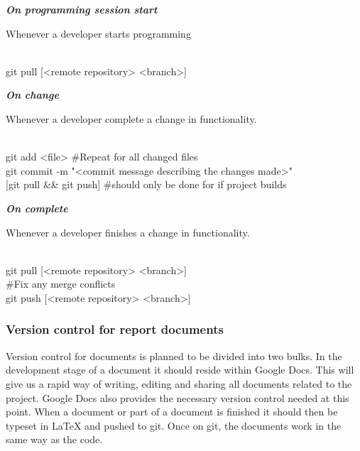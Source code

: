 \textit{\textbf{On programming session start}}
\begin{description}
	{\indentitem \item[Description:] Whenever a developer starts programming}
	{\indentitem \item[Command:] \hfill \\
		\hspace*{3em} git pull [<remote repository> <branch>]}
\end{description}

\textit{\textbf{On change}}
\begin{description}
	{\indentitem \item[Description:] Whenever a developer complete a change in functionality.}
	{\indentitem \item[Command:] \hfill \\
	\hspace*{3em} git add <file> \#Repeat for all changed files \\
	\hspace*{3em} git commit -m "<commit message describing the changes made>"\\
	\hspace*{3em} [git pull \&\& git push] \#should only be done for if project builds}
\end{description}

\textit{\textbf{On complete}}
\begin{description}
{\indentitem \item[Description:]  Whenever a developer finishes a change in functionality.}
{\indentitem \item[Command:] \hfill \\
\hspace*{3em} git pull [<remote repository> <branch>] \\ 
\hspace*{3em} \#Fix any merge conflicts \\
\hspace*{3em} git push [<remote repository> <branch>] }
\end{description}

\subsubsection{Version control for report documents}
Version control for documents is planned to be divided into two bulks. In the development stage of a document it should reside within Google Docs. This will give us a rapid way of writing, editing and sharing all documents related to the project. Google Docs also provides the necessary version control needed at this point. When a document or part of a document is finished it should then be typeset in LaTeX and pushed to \gls{git}. Once on \gls{git}, the documents work in the same way as the code.  


